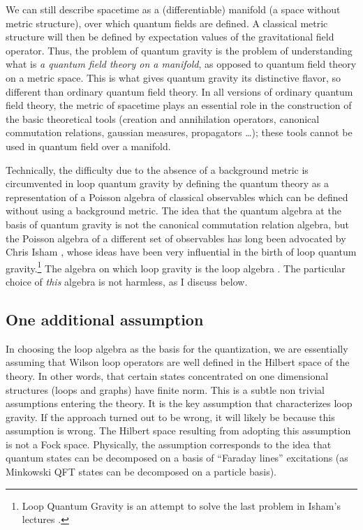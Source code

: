 We can still describe spacetime as a (differentiable) manifold (a 
space without metric structure), over which quantum fields are 
defined.  A classical metric structure will then be defined by 
expectation values of the gravitational field operator.  Thus, 
the problem of quantum gravity is the problem of understanding 
what is {\em a quantum field theory on a manifold}, 
as opposed to quantum field theory on a metric space.  This is 
what gives quantum gravity its distinctive flavor, so different 
than ordinary quantum field theory.  In all versions of ordinary 
quantum field theory, the metric of spacetime plays an essential 
role in the construction of the basic theoretical tools (creation 
and annihilation operators, canonical commutation relations, 
gaussian measures, propagators \ldots ); these tools cannot be 
used in quantum field over a manifold.

Technically, the difficulty due to the absence of a background 
metric is circumvented in loop quantum gravity by defining the 
quantum theory as a representation of a Poisson algebra of 
classical observables which can be defined without using a 
background metric.  The idea that the quantum algebra at the basis 
of quantum gravity is not the canonical commutation relation 
algebra, but the Poisson algebra of a different set of observables 
has long been advocated by Chris Isham \cite{IshamLesHouches}, 
whose ideas have been very influential in the birth of loop 
quantum gravity.\footnote{Loop Quantum Gravity is an attempt to 
solve the last problem in Isham's lectures 
\cite{IshamLesHouches}.} The algebra on which loop gravity is the 
loop algebra \cite{RovelliSmolin90}.  The particular choice of 
{\em this\/} algebra is not harmless, as I discuss below.

\subsection{One additional assumption} \label{Additional}

In choosing the loop algebra as the basis for the quantization, 
we are essentially assuming that Wilson loop operators are well 
defined in the Hilbert space of the theory.  In other words, that 
certain states concentrated on one dimensional structures (loops 
and graphs) have finite norm.  This is a subtle non trivial 
assumptions entering the theory.  It is the key assumption that 
characterizes loop gravity.  If the approach turned out to be 
wrong, it will likely be because this assumption is wrong.  The 
Hilbert space resulting from adopting this assumption is not a 
Fock space.  Physically, the assumption corresponds to the idea 
that quantum states can be decomposed on a basis of ``Faraday 
lines'' excitations (as Minkowski QFT states can be decomposed on 
a particle basis).

